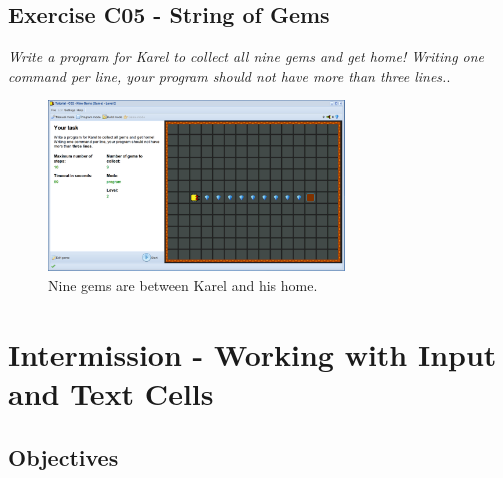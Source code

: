 \documentclass[article,A4,12pt]{llncs}
\begin{document}
{{{{\newpage

\subsection{Exercise C05 - String of Gems}

{\em Write a program for Karel to collect all nine gems and get home! 
Writing one command per line, your program should not have more 
than three lines.}.

\begin{figure}[!ht]
\begin{center}
\includegraphics[width=0.7\textwidth]{img/c05.png}
\end{center}
\vspace{-4mm}
\caption{Nine gems are between Karel and his home.}
\label{fig:c05}
\end{figure}
\noindent

\section{Intermission - Working with Input and Text Cells} \label{sec:editmenu}

\subsection{Objectives} 
 
}}}}
\end{document}
